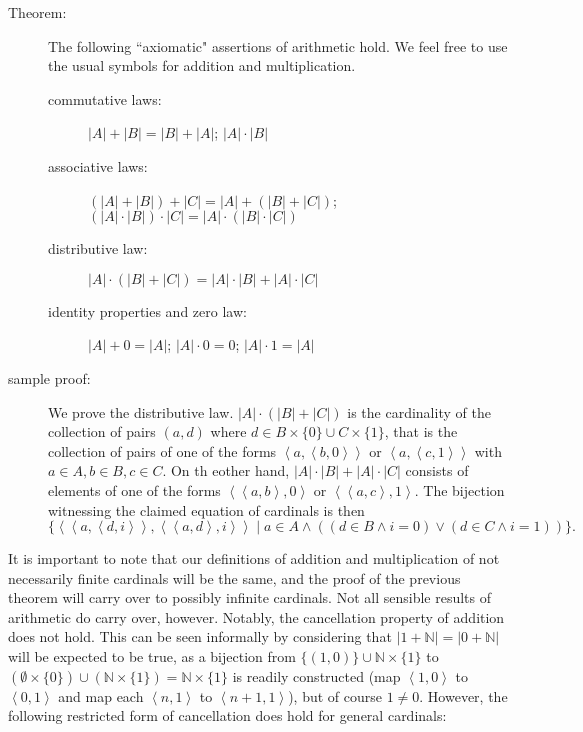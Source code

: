 \documentclass[12pt]{book}
\begin{document}
\begin{description}

\item[Theorem:]  The following ``axiomatic" assertions of arithmetic hold.  We feel free to use the usual symbols for addition and multiplication.

\begin{description}

\item[commutative laws:]  $|A| + |B|=|B|+|A|$;  $|A|\cdot |B|$

\item[associative laws:]  $(|A|+|B|)+|C| = |A|+(|B|+|C|)$;   $(|A|\cdot|B|)\cdot|C| = |A|\cdot(|B|\cdot|C|)$

\item[distributive law:]  $|A| \cdot (|B|+|C|) = |A|\cdot |B| + |A| \cdot |C|$

\item[identity properties and zero law:]  $|A|+0=|A|$;  $|A| \cdot 0 = 0$; $|A|\cdot 1=|A|$

\end{description}

\item[sample proof:]  We prove the distributive law.  $|A| \cdot (|B|+|C|)$ is the cardinality of the collection of pairs $(a,d)$ where $d \in B \times\{0\} \cup C \times \{1\}$,
that is the collection of pairs of one of the forms $\left<a,\left<b,0\right>\right>$ or   $\left<a,\left<c,1\right>\right>$ with $a \in A, b \in B , c \in C$.  On th eother hand, $|A|\cdot |B| + |A| \cdot |C|$ consists
of elements of one of the forms $\left<\left<a,b\right>,0\right>$ or $\left<\left<a,c\right>,1\right>$.   The bijection witnessing the claimed equation of cardinals is then
$$\{\left<\left<a,\left<d,i\right>\right>,\left<\left<a,d\right>,i\right>\right> \mid a \in A \wedge ((d \in B \wedge i=0) \vee (d \in C \wedge i=1))\}.$$

\end{description}

It is important to note that our definitions of addition and multiplication of not necessarily finite cardinals will be the same, and the proof of the previous theorem will carry over to possibly infinite cardinals.  Not all sensible results of arithmetic do carry over, however.  Notably, the cancellation property of addition does not hold.  This can be seen informally by considering
that $|1 + {\mathbb N}| = |0 + {\mathbb N}|$ will be expected to be true, as a bijection from $\{(1,0)\} \cup {\mathbb N} \times \{1\}$ to $(\emptyset \times \{0\}) \cup ({\mathbb N} \times \{1\}) = {\mathbb N} \times \{1\}$ is readily constructed (map $\left<1,0\right>$ to $\left<0,1\right>$ and map each $\left<n,1\right>$ to $\left<n+1,1\right>$), but of course $1 \neq 0$.  However, the following restricted form of cancellation does hold for general cardinals:
\end{document}

